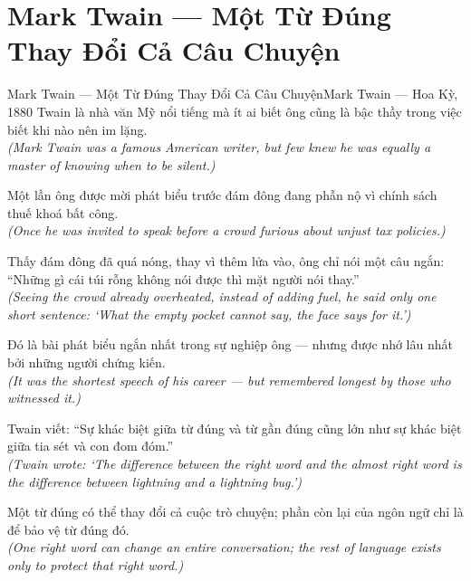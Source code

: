 \section{Mark Twain --- Một Từ Đúng Thay Đổi Cả Câu Chuyện}
\begin{truyen}{Mark Twain --- Một Từ Đúng Thay Đổi Cả Câu Chuyện}{Mark Twain --- Hoa Kỳ, 1880}
 Twain là nhà văn Mỹ nổi tiếng mà ít ai biết ông cũng là bậc thầy trong việc biết khi nào nên im lặng.\\[4pt]
\textit{(Mark Twain was a famous American writer, but few knew he was equally a master of knowing when to be silent.)}

Một lần ông được mời phát biểu trước đám đông đang phẫn nộ vì chính sách thuế khoá bất công.\\[4pt]
\textit{(Once he was invited to speak before a crowd furious about unjust tax policies.)}

Thấy đám đông đã quá nóng, thay vì thêm lửa vào, ông chỉ nói một câu ngắn: ``Những gì cái túi rỗng không nói được thì mặt người nói thay.''\\[4pt]
\textit{(Seeing the crowd already overheated, instead of adding fuel, he said only one short sentence: `What the empty pocket cannot say, the face says for it.')}

Đó là bài phát biểu ngắn nhất trong sự nghiệp ông --- nhưng được nhớ lâu nhất bởi những người chứng kiến.\\[4pt]
\textit{(It was the shortest speech of his career --- but remembered longest by those who witnessed it.)}

Twain viết: ``Sự khác biệt giữa từ đúng và từ gần đúng cũng lớn như sự khác biệt giữa tia sét và con đom đóm.''\\[4pt]
\textit{(Twain wrote: `The difference between the right word and the almost right word is the difference between lightning and a lightning bug.')}

\end{truyen}
\begin{baihoc}
  Một từ đúng có thể thay đổi cả cuộc trò chuyện; phần còn lại của ngôn ngữ chỉ là để bảo vệ từ đúng đó.\\[4pt]
  \textit{(One right word can change an entire conversation; the rest of language exists only to protect that right word.)}
\end{baihoc}


